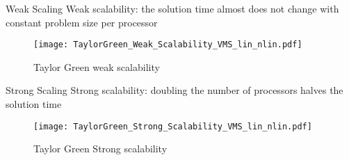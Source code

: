 \begin{frame}{Weak Scaling}
Weak scalability: the solution time almost does not change with constant problem size per processor
\begin{figure}
         \centering
         \texttt{[image: TaylorGreen\_Weak\_Scalability\_VMS\_lin\_nlin.pdf]}
         \caption{Taylor Green weak scalability}
\end{figure} 
\end{frame}

\begin{frame}{Strong Scaling}
Strong scalability: doubling the number of processors halves the solution time

\begin{figure}
         \centering
         \texttt{[image: TaylorGreen\_Strong\_Scalability\_VMS\_lin\_nlin.pdf]}
         \caption{Taylor Green Strong scalability}
\end{figure} 
\end{frame}